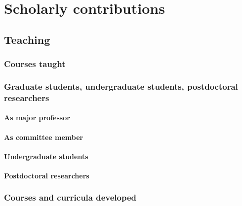 \section{Scholarly contributions}

\subsection{Teaching}

\subsubsection{Courses taught}


\subsubsection{Graduate students, undergraduate students, postdoctoral researchers}

\paragraph{As major professor}


\paragraph{As committee member}


\paragraph{Undergraduate students}


\paragraph{Postdoctoral researchers}


% 

\subsubsection{Courses and curricula developed}


